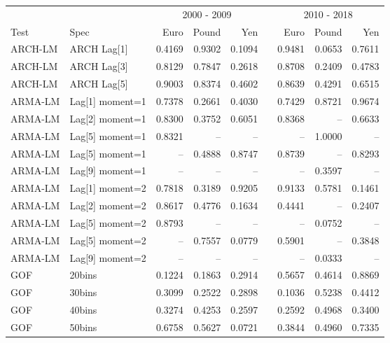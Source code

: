 \documentclass[12pt]{article}
\begin{document}
\begin{table}
	\fontsize{10pt}{10pt}\selectfont
	\begin{tabular}[c]{l l r r r c r r r}
		\midrule
                & & \multicolumn{3}{c}{2000 - 2009} & & \multicolumn{3}{c}{2010 - 2018} \\ \addlinespace[1mm]
		\cline{3-5} \cline{7-9}
    Test  & Spec               & Euro   & Pound  & Yen    & &   Euro &  Pound & Yen     \\ \addlinespace[1mm]
		\midrule
  ARCH-LM &        ARCH Lag[1] & 0.4169 & 0.9302 & 0.1094 & & 0.9481 & 0.0653 & 0.7611 \\
  ARCH-LM &        ARCH Lag[3] & 0.8129 & 0.7847 & 0.2618 & & 0.8708 & 0.2409 & 0.4783 \\
  ARCH-LM &        ARCH Lag[5] & 0.9003 & 0.8374 & 0.4602 & & 0.8639 & 0.4291 & 0.6515 \\
  ARMA-LM &    Lag[1] moment=1 & 0.7378 & 0.2661 & 0.4030 & & 0.7429 & 0.8721 & 0.9674 \\
  ARMA-LM &    Lag[2] moment=1 & 0.8300 & 0.3752 & 0.6051 & & 0.8368 &     -- & 0.6633 \\
  ARMA-LM &    Lag[5] moment=1 & 0.8321 &     -- &     -- & &     -- & 1.0000 &     -- \\
  ARMA-LM &    Lag[5] moment=1 &     -- & 0.4888 & 0.8747 & & 0.8739 &     -- & 0.8293 \\
  ARMA-LM &    Lag[9] moment=1 &     -- &     -- &     -- & &     -- & 0.3597 &     -- \\
  ARMA-LM &    Lag[1] moment=2 & 0.7818 & 0.3189 & 0.9205 & & 0.9133 & 0.5781 & 0.1461 \\
  ARMA-LM &    Lag[2] moment=2 & 0.8617 & 0.4776 & 0.1634 & & 0.4441 &     -- & 0.2407 \\
  ARMA-LM &    Lag[5] moment=2 & 0.8793 &     -- &     -- & &     -- & 0.0752 &     -- \\
  ARMA-LM &    Lag[5] moment=2 &     -- & 0.7557 & 0.0779 & & 0.5901 &     -- & 0.3848 \\
  ARMA-LM &    Lag[9] moment=2 &     -- &     -- &     -- & &     -- & 0.0333 &     -- \\
      GOF &             20bins & 0.1224 & 0.1863 & 0.2914 & & 0.5657 & 0.4614 & 0.8869 \\
      GOF &             30bins & 0.3099 & 0.2522 & 0.2898 & & 0.1036 & 0.5238 & 0.4412 \\
      GOF &             40bins & 0.3274 & 0.4253 & 0.2597 & & 0.2592 & 0.4968 & 0.3400 \\
      GOF &             50bins & 0.6758 & 0.5627 & 0.0721 & & 0.3844 & 0.4960 & 0.7335 \\

\end{tabular}
\end{table}
\end{document}

